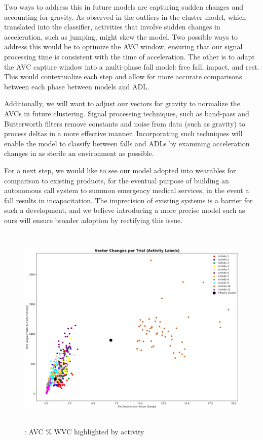 \documentclass{llncs}
\begin{document}
	Two ways to address this in future models are capturing sudden changes and accounting for gravity. As observed in the outliers in the cluster model, which translated into the classifier, activities that involve sudden changes in acceleration, such as jumping, might skew the model. Two possible ways to address this would be to optimize the AVC window, ensuring that our signal processing time is consistent with the time of acceleration. The other is to adapt the AVC capture window into a multi-phase fall model: free fall, impact, and rest. This would contextualize each step and allow for more accurate comparisons between each phase between models and ADL.
	
	Additionally, we will want to adjust our vectors for gravity to normalize the AVCs in future clustering. Signal processing techniques, such as band-pass and Butterworth filters remove constants and noise from data (such as gravity) to process deltas in a more effective manner. Incorporating such techniques will enable the model to classify between falls and ADLs by examining acceleration changes in as sterile an environment as possible.

	For a next step, we would like to see our model adopted into wearables for comparison to existing products, for the eventual purpose of building an autonomous call system to summon emergency medical services, in the event a fall results in incapacitation. The imprecision of existing systems is a barrier for such a development, and we believe introducing a more precise model such as ours will ensure broader adoption by rectifying this issue.




\begin{figure} 
	\centering
	\includegraphics[width=12cm, height=10cm]{images/VC_11clusters.png} 
	\caption{: AVC \% WVC highlighted by activity}
	\label{Figure 6: K-Means Clusters of AVC and WVC Values per Trial}
\end{figure}
\end{document}
